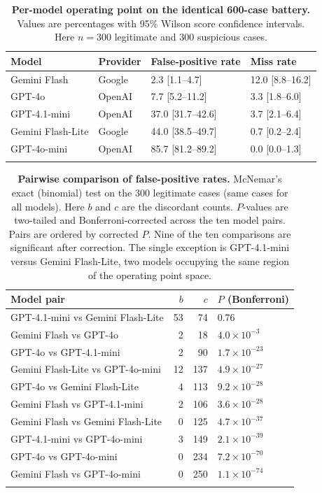 \documentclass[pdflatex,sn-basic,Numbered]{sn-jnl}
\begin{document}
\begin{table}[t]
\caption{\textbf{Per-model operating point on the identical 600-case battery.} Values are percentages with 95\% Wilson score confidence intervals. Here $n=300$ legitimate and 300 suspicious cases.}\label{tab:ops}
\begin{tabular}{@{}llll@{}}
\toprule
Model & Provider & False-positive rate & Miss rate \\
\midrule
Gemini Flash      & Google & 2.3 [1.1--4.7] & 12.0 [8.8--16.2] \\
GPT-4o            & OpenAI & 7.7 [5.2--11.2] & 3.3 [1.8--6.0] \\
GPT-4.1-mini      & OpenAI & 37.0 [31.7--42.6] & 3.7 [2.1--6.4] \\
Gemini Flash-Lite & Google & 44.0 [38.5--49.7] & 0.7 [0.2--2.4] \\
GPT-4o-mini       & OpenAI & 85.7 [81.2--89.2] & 0.0 [0.0--1.3] \\
\botrule
\end{tabular}
\end{table}

\begin{table}[t]
\caption{\textbf{Pairwise comparison of false-positive rates.} McNemar's exact (binomial) test on the 300 legitimate cases (same cases for all models). Here $b$ and $c$ are the discordant counts. $P$-values are two-tailed and Bonferroni-corrected across the ten model pairs. Pairs are ordered by corrected $P$. Nine of the ten comparisons are significant after correction. The single exception is GPT-4.1-mini versus Gemini Flash-Lite, two models occupying the same region of the operating point space.}\label{tab:mcnemar}
\begin{tabular}{@{}lrrl@{}}
\toprule
Model pair & $b$ & $c$ & $P$ (Bonferroni) \\
\midrule
GPT-4.1-mini vs Gemini Flash-Lite      & 53 & 74 & 0.76 \\
Gemini Flash vs GPT-4o                 & 2 & 18 & $4.0\times10^{-3}$ \\
GPT-4o vs GPT-4.1-mini                 & 2 & 90 & $1.7\times10^{-23}$ \\
Gemini Flash-Lite vs GPT-4o-mini       & 12 & 137 & $4.9\times10^{-27}$ \\
GPT-4o vs Gemini Flash-Lite            & 4 & 113 & $9.2\times10^{-28}$ \\
Gemini Flash vs GPT-4.1-mini           & 2 & 106 & $3.6\times10^{-28}$ \\
Gemini Flash vs Gemini Flash-Lite      & 0 & 125 & $4.7\times10^{-37}$ \\
GPT-4.1-mini vs GPT-4o-mini            & 3 & 149 & $2.1\times10^{-39}$ \\
GPT-4o vs GPT-4o-mini                  & 0 & 234 & $7.2\times10^{-70}$ \\
Gemini Flash vs GPT-4o-mini            & 0 & 250 & $1.1\times10^{-74}$ \\
\botrule
\end{tabular}
\end{table}
\end{document}
